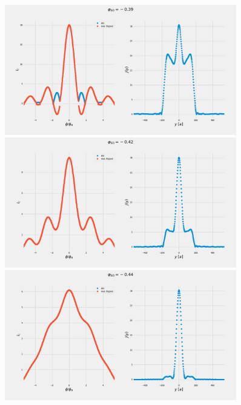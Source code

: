 \documentclass[a4paper]{article}
\begin{document}
\begin{figure}
	\includegraphics[width=0.9\textwidth]{figs/wg32/current_and_density_039}
	\includegraphics[width=0.9\textwidth]{figs/wg32/current_and_density_042}
	\includegraphics[width=0.9\textwidth]{figs/wg32/current_and_density_044}
\end{figure}
\end{document}
